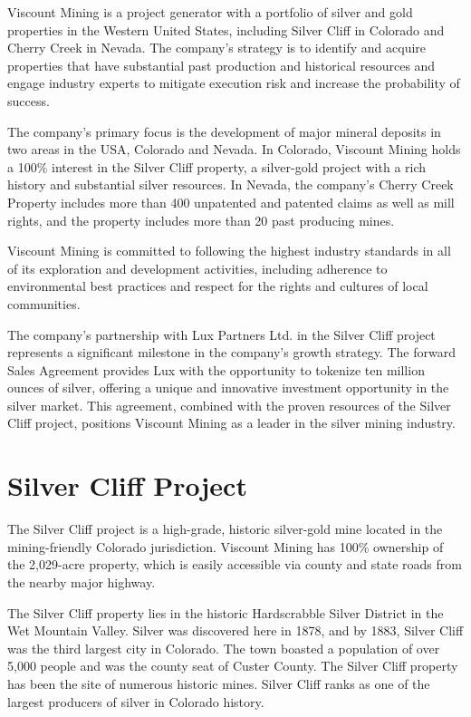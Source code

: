 \documentclass[11pt]{article}
\begin{document}
Viscount Mining is a project generator with a portfolio of silver and gold properties in the Western United States, including Silver Cliff in Colorado and Cherry Creek in Nevada. The company's strategy is to identify and acquire properties that have substantial past production and historical resources and engage industry experts to mitigate execution risk and increase the probability of success.


The company's primary focus is the development of major mineral deposits in two areas in the USA, Colorado and Nevada. In Colorado, Viscount Mining holds a 100\% interest in the Silver Cliff property, a silver-gold project with a rich history and substantial silver resources. In Nevada, the company's Cherry Creek Property includes more than 400 unpatented and patented claims as well as mill rights, and the property includes more than 20 past producing mines.


Viscount Mining is committed to following the highest industry standards in all of its exploration and development activities, including adherence to environmental best practices and respect for the rights and cultures of local communities.


The company's partnership with Lux Partners Ltd. in the Silver Cliff project represents a significant milestone in the company's growth strategy. The forward Sales Agreement provides Lux with the opportunity to tokenize ten million ounces of silver, offering a unique and innovative investment opportunity in the silver market. This agreement, combined with the proven resources of the Silver Cliff project, positions Viscount Mining as a leader in the silver mining industry.


\section{Silver Cliff Project}

The Silver Cliff project is a high-grade, historic silver-gold mine located in the mining-friendly Colorado jurisdiction. Viscount Mining has 100\% ownership of the 2,029-acre property, which is easily accessible via county and state roads from the nearby major highway.


The Silver Cliff property lies in the historic Hardscrabble Silver District in the Wet Mountain Valley. Silver was discovered here in 1878, and by 1883, Silver Cliff was the third largest city in Colorado. The town boasted a population of over 5,000 people and was the county seat of Custer County. The Silver Cliff property has been the site of numerous historic mines. Silver Cliff ranks as one of the largest producers of silver in Colorado history.
\end{document}
